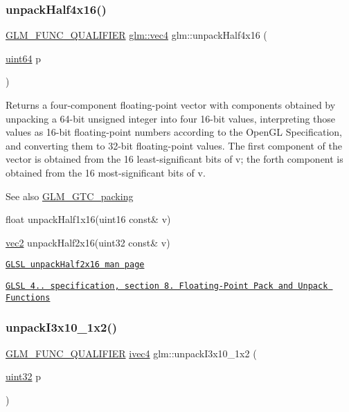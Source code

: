 \subsubsection{\texorpdfstring{unpack\+Half4x16()}{unpackHalf4x16()}}
{\footnotesize\ttfamily \mbox{\hyperlink{setup_8hpp_a33fdea6f91c5f834105f7415e2a64407}{G\+L\+M\+\_\+\+F\+U\+N\+C\+\_\+\+Q\+U\+A\+L\+I\+F\+I\+ER}} \mbox{\hyperlink{group__core__types_ga5881b1b022d7fd1b7218f5916532dd02}{glm\+::vec4}} glm\+::unpack\+Half4x16 (\begin{DoxyParamCaption}\item[{\mbox{\hyperlink{group__gtc__type__precision_gae3632bf9b37da66233d78930dd06378a}{uint64}}}]{p }\end{DoxyParamCaption})}

Returns a four-\/component floating-\/point vector with components obtained by unpacking a 64-\/bit unsigned integer into four 16-\/bit values, interpreting those values as 16-\/bit floating-\/point numbers according to the Open\+GL Specification, and converting them to 32-\/bit floating-\/point values. The first component of the vector is obtained from the 16 least-\/significant bits of v; the forth component is obtained from the 16 most-\/significant bits of v.

\begin{DoxySeeAlso}{See also}
\mbox{\hyperlink{group__gtc__packing}{G\+L\+M\+\_\+\+G\+T\+C\+\_\+packing}} 

float unpack\+Half1x16(uint16 const\& v) 

\mbox{\hyperlink{group__core__types_gaa1618f51db67eaa145db101d8c8431d8}{vec2}} unpack\+Half2x16(uint32 const\& v) 

\href{http://www.opengl.org/sdk/docs/manglsl/xhtml/unpackHalf2x16.xml}{\tt G\+L\+SL unpack\+Half2x16 man page} 

\href{http://www.opengl.org/registry/doc/GLSLangSpec.4.20.8.pdf}{\tt G\+L\+SL 4.. specification, section 8. Floating-\/\+Point Pack and Unpack Functions} 
\end{DoxySeeAlso}
\mbox{\label{group__gtc__packing_ga08bcd34cf9c34701d658dd861ee6e300}} 
\subsubsection{\texorpdfstring{unpack\+I3x10\+\_\+1x2()}{unpackI3x10\_1x2()}}
{\footnotesize\ttfamily \mbox{\hyperlink{setup_8hpp_a33fdea6f91c5f834105f7415e2a64407}{G\+L\+M\+\_\+\+F\+U\+N\+C\+\_\+\+Q\+U\+A\+L\+I\+F\+I\+ER}} \mbox{\hyperlink{group__core__types_gaa4560ddc50320ea8f8a70d5c9c249fea}{ivec4}} glm\+::unpack\+I3x10\+\_\+1x2 (\begin{DoxyParamCaption}\item[{\mbox{\hyperlink{group__gtc__type__precision_ga202b6a53c105fcb7e531f9b443518451}{uint32}}}]{p }\end{DoxyParamCaption})}

